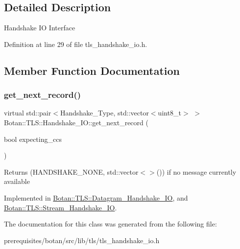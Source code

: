 \subsection{Detailed Description}
Handshake IO Interface 

Definition at line 29 of file tls\+\_\+handshake\+\_\+io.\+h.



\subsection{Member Function Documentation}
\mbox{\label{class_botan_1_1_t_l_s_1_1_handshake___i_o_a3ebecdb050cb44831453dda8498373a8}} 
\subsubsection{\texorpdfstring{get\+\_\+next\+\_\+record()}{get\_next\_record()}}
{\footnotesize\ttfamily virtual std\+::pair$<$Handshake\+\_\+\+Type, std\+::vector$<$uint8\+\_\+t$>$ $>$ Botan\+::\+T\+L\+S\+::\+Handshake\+\_\+\+I\+O\+::get\+\_\+next\+\_\+record (\begin{DoxyParamCaption}\item[{bool}]{expecting\+\_\+ccs }\end{DoxyParamCaption})\hspace{0.3cm}{\ttfamily [pure virtual]}}

Returns (H\+A\+N\+D\+S\+H\+A\+K\+E\+\_\+\+N\+O\+NE, std\+::vector$<$$>$()) if no message currently available 

Implemented in \mbox{\hyperlink{class_botan_1_1_t_l_s_1_1_datagram___handshake___i_o_a70dbb457e3ba6ae8d43522c4e6db3c3b}{Botan\+::\+T\+L\+S\+::\+Datagram\+\_\+\+Handshake\+\_\+\+IO}}, and \mbox{\hyperlink{class_botan_1_1_t_l_s_1_1_stream___handshake___i_o_aa198869863aa2d98b8a6c89e01e73d4d}{Botan\+::\+T\+L\+S\+::\+Stream\+\_\+\+Handshake\+\_\+\+IO}}.



The documentation for this class was generated from the following file\+:\begin{DoxyCompactItemize}
\item 
prerequisites/botan/src/lib/tls/tls\+\_\+handshake\+\_\+io.\+h\end{DoxyCompactItemize}
